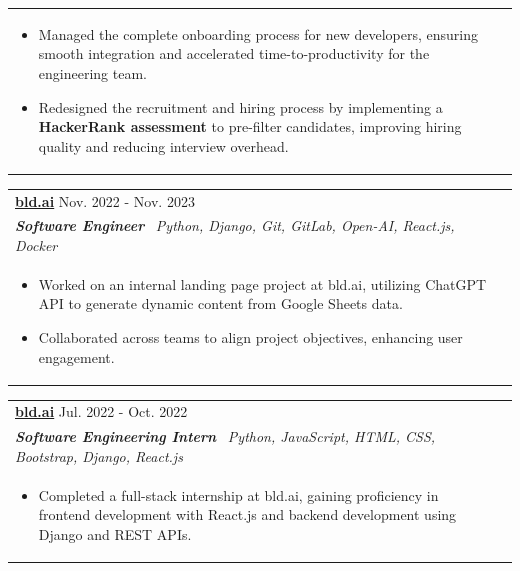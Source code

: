 \documentclass[a4paper,10pt]{article}
\begin{document}
\begin{tabularx}{\linewidth}{ @{}l r@{} }
\begin{minipage}[t]{\linewidth}
\begin{itemize}[nosep,after=\strut, leftmargin=2em, itemsep=2pt]
        \item Managed the complete onboarding process for new developers, ensuring smooth integration and accelerated time-to-productivity for the engineering team.
        \item Redesigned the recruitment and hiring process by implementing a \textbf{HackerRank assessment} to pre-filter candidates, improving hiring quality and reducing interview overhead.
    \end{itemize}
\end{minipage}
    \end{tabularx}





    \begin{tabularx}{\linewidth}{ @{}l r@{} }
\textbf{\uline{\href{https://www.bld.ai/}{bld.ai}}} \hfill \color[HTML]{371e77} Nov. 2022 - Nov. 2023 \\[4pt]
\color[HTML]{371e77}\textbf{\textit{Software Engineer}}\ \hfill \color[HTML]{4B28A4} \textit{Python, Django, Git, GitLab, Open-AI, React.js, Docker} \\[5pt]
\begin{minipage}[t]{\linewidth}
    \begin{itemize}[nosep,after=\strut, leftmargin=2em, itemsep=2pt]
        \item Worked on an internal landing page project at bld.ai, utilizing ChatGPT API to generate dynamic content from Google Sheets data.
        \item Collaborated across teams to align project objectives, enhancing user engagement.
    \end{itemize}
\end{minipage}
    \end{tabularx}

    \begin{tabularx}{\linewidth}{ @{}l r@{} }
\color[HTML]{1C033C} \textbf{\uline{\href{https://www.bld.ai/}{bld.ai}}} \hfill \color[HTML]{371e77} Jul. 2022 - Oct. 2022 \\[4pt]
\color[HTML]{371e77}\textbf{\textit{Software Engineering Intern}}\ \hfill \color[HTML]{4B28A4} \textit{Python, JavaScript, HTML, CSS, Bootstrap, Django, React.js} \\[5pt]
\begin{minipage}[t]{\linewidth}
    \begin{itemize}[nosep,after=\strut, leftmargin=2em, itemsep=2pt]
        \item Completed a full-stack internship at bld.ai, gaining proficiency in frontend development with React.js and backend development using Django and REST APIs.
    \end{itemize}
\end{minipage}
    \end{tabularx}
\end{document}
